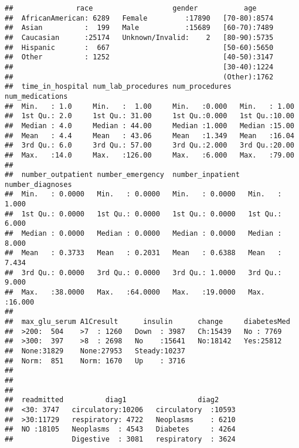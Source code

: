 \documentclass[]{article}
\begin{document}
\begin{verbatim}
##               race                   gender           age      
##  AfricanAmerican: 6289   Female         :17890   [70-80):8574  
##  Asian          :  199   Male           :15689   [60-70):7489  
##  Caucasian      :25174   Unknown/Invalid:    2   [80-90):5735  
##  Hispanic       :  667                           [50-60):5650  
##  Other          : 1252                           [40-50):3147  
##                                                  [30-40):1224  
##                                                  (Other):1762  
##  time_in_hospital num_lab_procedures num_procedures  num_medications
##  Min.   : 1.0     Min.   :  1.00     Min.   :0.000   Min.   : 1.00  
##  1st Qu.: 2.0     1st Qu.: 31.00     1st Qu.:0.000   1st Qu.:10.00  
##  Median : 4.0     Median : 44.00     Median :1.000   Median :15.00  
##  Mean   : 4.4     Mean   : 43.06     Mean   :1.349   Mean   :16.04  
##  3rd Qu.: 6.0     3rd Qu.: 57.00     3rd Qu.:2.000   3rd Qu.:20.00  
##  Max.   :14.0     Max.   :126.00     Max.   :6.000   Max.   :79.00  
##                                                                     
##  number_outpatient number_emergency  number_inpatient  number_diagnoses
##  Min.   : 0.0000   Min.   : 0.0000   Min.   : 0.0000   Min.   : 1.000  
##  1st Qu.: 0.0000   1st Qu.: 0.0000   1st Qu.: 0.0000   1st Qu.: 6.000  
##  Median : 0.0000   Median : 0.0000   Median : 0.0000   Median : 8.000  
##  Mean   : 0.3733   Mean   : 0.2031   Mean   : 0.6388   Mean   : 7.434  
##  3rd Qu.: 0.0000   3rd Qu.: 0.0000   3rd Qu.: 1.0000   3rd Qu.: 9.000  
##  Max.   :38.0000   Max.   :64.0000   Max.   :19.0000   Max.   :16.000  
##                                                                        
##  max_glu_serum A1Cresult      insulin      change     diabetesMed
##  >200:  504    >7  : 1260   Down  : 3987   Ch:15439   No : 7769  
##  >300:  397    >8  : 2698   No    :15641   No:18142   Yes:25812  
##  None:31829    None:27953   Steady:10237                         
##  Norm:  851    Norm: 1670   Up    : 3716                         
##                                                                  
##                                                                  
##                                                                  
##  readmitted          diag1                 diag2      
##  <30: 3747   circulatory:10206   circulatory  :10593  
##  >30:11729   respiratory: 4722   Neoplasms    : 6210  
##  NO :18105   Neoplasms  : 4543   Diabetes     : 4264  
##              Digestive  : 3081   respiratory  : 3624  

\end{verbatim}
\end{document}
